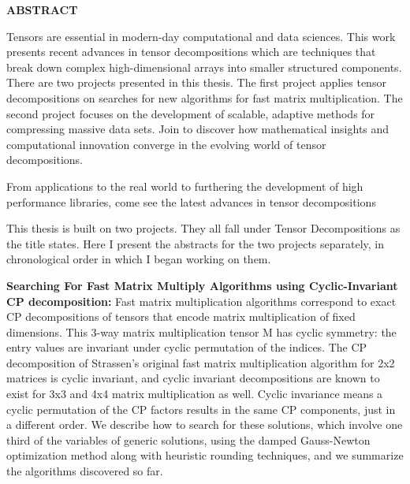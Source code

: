 \documentclass[MS]{wfuthesis}
\begin{document}
    \begin{center}
        \textbf{ABSTRACT}
    \end{center}
    Tensors are essential in modern-day computational and data sciences. This
    work presents recent advances in tensor decompositions which are techniques
    that break down complex high-dimensional arrays into smaller structured
    components. There are two projects presented in this thesis. The first
    project applies tensor decompositions on searches for new algorithms for
    fast matrix multiplication. The second project focuses on the development of
    scalable, adaptive methods for compressing massive data sets. Join to
    discover how mathematical insights and computational innovation converge in
    the evolving world of tensor decompositions.
    
    From applications to the real world to furthering
    the development of high performance libraries, come see the latest advances
    in tensor decompositions

    This thesis is built on two projects. They all fall under Tensor
    Decompositions as the title states. Here I present the abstracts for the two
    projects separately, in chronological order in which I began working on
    them.

    \textbf{Searching For Fast Matrix Multiply Algorithms using Cyclic-Invariant
    CP decomposition:} Fast matrix multiplication algorithms correspond to exact
    CP decompositions of tensors that encode matrix multiplication of fixed
    dimensions. This 3-way matrix multiplication tensor M has cyclic symmetry:
    the entry values are invariant under cyclic permutation of the indices. The
    CP decomposition of Strassen's original fast matrix multiplication algorithm
    for 2x2 matrices is cyclic invariant, and cyclic invariant decompositions
    are known to exist for 3x3 and 4x4 matrix multiplication as well. Cyclic
    invariance means a cyclic permutation of the CP factors results in the same
    CP components, just in a different order. We describe how to search for
    these solutions, which involve one third of the variables of generic
    solutions, using the damped Gauss-Newton optimization method along with
    heuristic rounding techniques, and we summarize the algorithms discovered so
    far.
\end{document}
